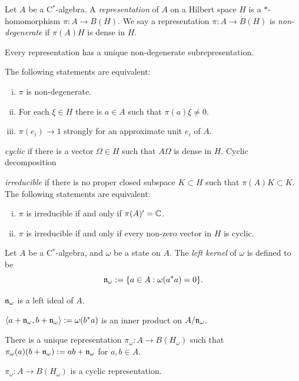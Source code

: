 \documentclass{../../large}
\begin{document}
\begin{prb}
Let $A$ be a C$^*$-algebra.
A \emph{representation} of $A$ on a Hilbert space $H$ is a $*$-homomorphism $\pi:A\to B(H)$.
We say a representation $\pi:A\to B(H)$ is \emph{non-degenerate} if $\pi(A)H$ is dense in $H$.
\begin{parts}
\item Every representation has a unique non-degenerate subrepresentation.
\item The following statements are equivalent:
\begin{enumerate}[(i)]
\item $\pi$ is non-degenerate.
\item For each $\xi\in H$ there is $a\in A$ such that $\pi(a)\xi\ne0$.
\item $\pi(e_i)\to1$ strongly for an approximate unit $e_i$ of $A$.
\end{enumerate}
\end{parts}
\end{prb}

\begin{prb}
\emph{cyclic} if there is a vector $\Omega\in H$ such that $A\Omega$ is dense in $H$.
Cyclic decomposition
\end{prb}


\begin{prb}
\emph{irreducible} if there is no proper closed subspace $K\subset H$ such that $\pi(A)K\subset K$.
The following statements are equivalent:
\begin{enumerate}[(i)]
\item $\pi$ is irreducible if and only if $\pi(A)'=\mathbb{C}$.
\item $\pi$ is irreducible if and only if every non-zero vector in $H$ is cyclic.
\end{enumerate}
\end{prb}


\begin{prb}
Let $A$ be a C$^*$-algebra, and $\omega$ be a state on $A$.
The \emph{left kernel} of $\omega$ is defined to be
\[\mathfrak{n}_\omega:=\{a\in A:\omega(a^*a)=0\}.\]
\begin{parts}
\item $\mathfrak{n}_\omega$ is a left ideal of $A$.
\item $\langle a+\mathfrak{n}_\omega,b+\mathfrak{n}_\omega\rangle:=\omega(b^*a)$ is an inner product on $A/\mathfrak{n}_\omega$.
\item There is a unique representation $\pi_\omega:A\to B(H_\omega)$ such that $\pi_\omega(a)(b+\mathfrak{n}_\omega):=ab+\mathfrak{n}_\omega$ for $a,b\in A$.
\item $\pi_\omega:A\to B(H_\omega)$ is a cyclic representation.
\end{parts}
\end{prb}
\end{document}
